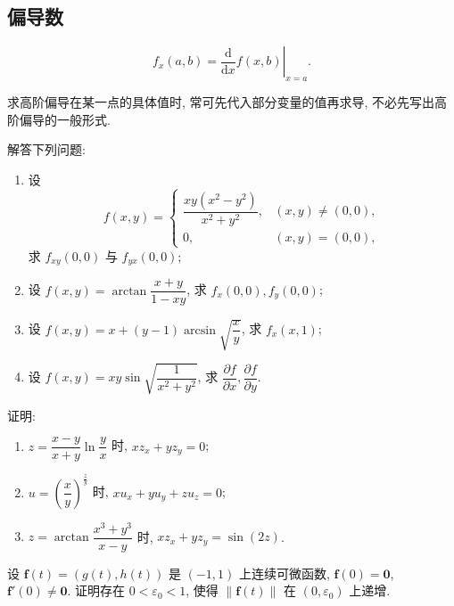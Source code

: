 \documentclass[../数学分析培优讲义.tex]{subfiles}
\begin{document}
\subsection{偏导数}

\begin{proposition}[\markstar]
\[
    f_x(a,b)=\left.\dfrac{\mathrm{d}}{\mathrm{d}x}f(x,b)\right|_{x=a}.
\]
\end{proposition}

\begin{remark}
求高阶偏导在某一点的具体值时, 常可先代入部分变量的值再求导, 不必先写出高阶偏导的一般形式.
\end{remark}

\begin{example}
解答下列问题:
\begin{enumerate}[label=(\arabic*)]
    \item 设
    \[
        f(x,y)=
        \begin{cases}
            \dfrac{xy(x^2-y^2)}{x^2+y^2}, & (x,y)\ne(0,0),\\
            0, & (x,y)=(0,0),
        \end{cases}
    \]
    求 $f_{xy}(0,0)$ 与 $f_{yx}(0,0)$;
    \item 设 $\displaystyle f(x,y)=\arctan\dfrac{x+y}{1-xy}$, 求 $f_x(0,0),f_y(0,0)$;
    \item 设 $\displaystyle f(x,y)=x+(y-1)\arcsin\sqrt{\dfrac{x}{y}}$, 求 $f_x(x,1)$;
    \item 设 $\displaystyle f(x,y)=xy\sin\sqrt{\dfrac{1}{x^2+y^2}}$, 求 $\dfrac{\partial f}{\partial x},\dfrac{\partial f}{\partial y}$.
\end{enumerate}
\end{example}
\exampleblank

\begin{example}
证明:
\begin{enumerate}[label=(\arabic*)]
    \item $\displaystyle z=\dfrac{x-y}{x+y}\ln\dfrac{y}{x}$ 时, $xz_x+yz_y=0$;
    \item $\displaystyle u=\left(\dfrac{x}{y}\right)^{\frac{z}{y}}$ 时, $xu_x+yu_y+zu_z=0$;
    \item $\displaystyle z=\arctan\dfrac{x^3+y^3}{x-y}$ 时, $xz_x+yz_y=\sin(2z)$.
\end{enumerate}
\end{example}
\exampleblank

\begin{example}
设 $\bm f(t)=(g(t),h(t))$ 是 $(-1,1)$ 上连续可微函数, $\bm f(0)=\bm{0}$, $\bm f'(0)\ne\bm{0}$. 证明存在 $0<\varepsilon_0<1$, 使得 $\|\bm f(t)\|$ 在 $(0,\varepsilon_0)$ 上递增.
\end{example}
\exampleblank
\end{document}
